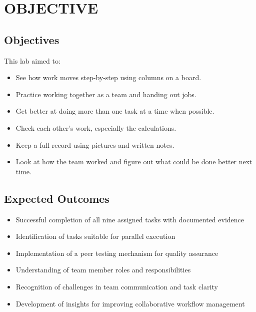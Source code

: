 \chapter{OBJECTIVE}\label{obj}


\section{Objectives}
This lab aimed to:

\begin{itemize}
    \item See how work moves step-by-step using columns on a board.
    \item Practice working together as a team and handing out jobs.
    \item Get better at doing more than one task at a time when possible.
    \item Check each other's work, especially the calculations.
    \item Keep a full record using pictures and written notes.
    \item Look at how the team worked and figure out what could be done better next time.
\end{itemize}


\section{Expected Outcomes}

\begin{itemize}
    \item Successful completion of all nine assigned tasks with documented evidence
    \item Identification of tasks suitable for parallel execution
    \item Implementation of a peer testing mechanism for quality assurance
    \item Understanding of team member roles and responsibilities
    \item Recognition of challenges in team communication and task clarity
    \item Development of insights for improving collaborative workflow management
\end{itemize}


